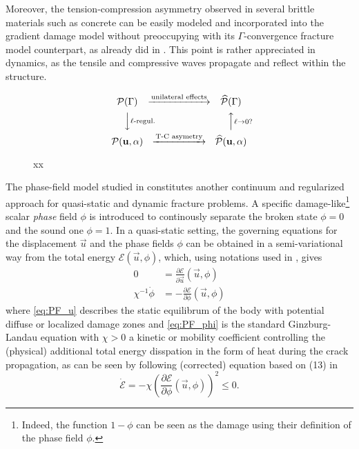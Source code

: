 Moreover, the tension-compression asymmetry observed in several brittle materials such as concrete can be easily modeled and incorporated into the gradient damage model without preoccupying with its $\Gamma$-convergence fracture model counterpart, as already did in \cite{AmorMarigoMaurini:2009,FreddiRoyer-Carfagni:2010,LancioniRoyer-Carfagni:2009}. This point is rather appreciated in dynamics, as the tensile and compressive waves propagate and reflect within the structure.
\begin{figure}[htbp]
\centering
\[
\begin{CD}
\mathcal{P}(\Gamma) @>\text{unilateral effects}>> \widehat{\mathcal{P}}(\Gamma) \\
@VV\text{$\ell$-regul.}V @AA{\ell\to 0?}A \\
\mathcal{P}(\vec{u},\alpha) @>\text{T-C asymetry}>> \widehat{\mathcal{P}}(\vec{u},\alpha)
\end{CD}
\]
\caption{xx} \label{fig:TCunilateral}
\end{figure}

The phase-field model studied in \cite{KarmaKesslerLevine:2001,HakimKarma:2009} constitutes another continuum and regularized approach for quasi-static and dynamic fracture problems. A specific damage-like\footnote{Indeed, the function $1-\phi$ can be seen as the damage using their definition of the phase field $\phi$.} scalar \emph{phase} field $\phi$ is introduced to continously separate the broken state $\phi=0$ and the sound one $\phi=1$. In a quasi-static setting, the governing equations for the displacement $\vec{u}$ and the phase fields $\phi$ can be obtained in a semi-variational way from the total energy $\mathcal{E}(\vec{u},\phi)$, which, using notations used in \cite{HakimKarma:2009}, gives
\begin{align}
0 &= \frac{\partial\mathcal{E}}{\partial\vec{u}}(\vec{u},\phi) \label{eq:PF_u} \\
\chi^{-1}\dot{\phi} &= -\frac{\partial\mathcal{E}}{\partial\phi}(\vec{u},\phi) \label{eq:PF_phi}
\end{align}
where \eqref{eq:PF_u} describes the static equilibrum of the body with potential diffuse or localized damage zones and \eqref{eq:PF_phi} is the standard Ginzburg-Landau equation with $\chi>0$ a kinetic or mobility \cite{KuhnMuller:2010} coefficient controlling the (physical) additional total energy disspation in the form of heat during the crack propagation, as can be seen by following (corrected) equation based on (13) in \cite{HakimKarma:2009}
\begin{equation} \label{eq:PF_dissipation}
\dot{\mathcal{E}}=-\chi\left(\frac{\partial\mathcal{E}}{\partial\phi}(\vec{u},\phi)\right)^2\leq 0.
\end{equation}

